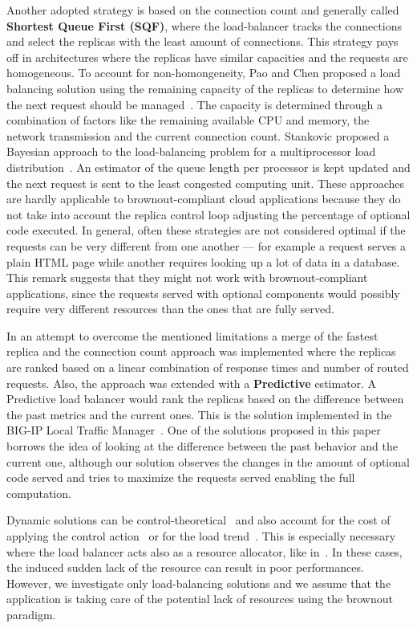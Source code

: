 Another adopted strategy is based on the connection count and
generally called \textbf{Shortest Queue First (SQF)}, where the
load-balancer tracks the connections and select the replicas with the
least amount of connections. This strategy pays off in architectures
where the replicas have similar capacities and the requests are
homogeneous. To account for non-homongeneity, Pao and Chen proposed a
load balancing solution using the remaining capacity of the replicas
to determine how the next request should be
managed~\cite{feedbackintensive}. The capacity is determined through a
combination of factors like the remaining available CPU and memory,
the network transmission and the current connection count. Stankovic
proposed a Bayesian approach to the load-balancing problem for a
multiprocessor load distribution~\cite{Stankovic:TC}. An estimator of
the queue length per processor is kept updated and the next request is
sent to the least congested computing unit. These approaches are
hardly applicable to brownout-compliant cloud applications because
they do not take into account the replica control loop adjusting the
percentage of optional code executed. In general, often these
strategies are not considered optimal if the requests can be very
different from one another --- for example a request serves a plain
HTML page while another requires looking up a lot of data in a
database. This remark suggests that they might not work with
brownout-compliant applications, since the requests served with
optional components would possibly require very different resources
than the ones that are fully served.

In an attempt to overcome the mentioned limitations a merge of the
fastest replica and the connection count approach was implemented
where the replicas are ranked based on a linear combination of
response times and number of routed requests. Also, the approach was
extended with a \textbf{Predictive} estimator. A Predictive load
balancer would rank the replicas based on the difference between the
past metrics and the current ones. This is the solution implemented in
the BIG-IP Local Traffic Manager~\cite{BIGIP}. One of the solutions
proposed in this paper borrows the idea of looking at the difference
between the past behavior and the current one, although our solution
observes the changes in the amount of optional code served and tries
to maximize the requests served enabling the full computation.

Dynamic solutions can be
control-theoretical~\cite{multipathctlb,comparisonstaticdynamic} and
also account for the cost of applying the control
action~\cite{costofcontrol} or for the load trend~\cite{CasolariSA}.
This is especially necessary where the load balancer acts also as a
resource allocator, like in~\cite{Ardagnaalltogether}. In these cases,
the induced sudden lack of the resource can result in poor
performances. However, we investigate only load-balancing solutions
and we assume that the application is taking care of the potential
lack of resources using the brownout paradigm.
